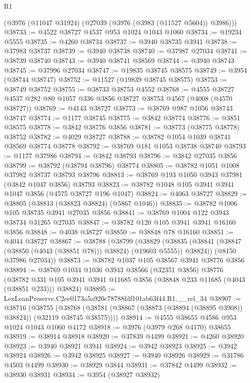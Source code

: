 \begin{lexlean}{R1}
\begin{coremodule}
    (@3976 (@11047 @31924) (@27039 (@3976 (@3983 (@11527 @5604)) @3986)))
@38733 := @4522 @38727 @4537 @953 @1024 @1043 @1060
@38734 := @19234 @5555
@38735 := @4260 @38734
@38737 := @3940 @38735 @3941
@38738 := @37983 @38737
@38739 := @3940 @38738
@38740 := @37987 @27034
@38741 := @38739 @38740
@38743 := @3940 @38741 @38569
@38744 := @3940 @38743
@38745 := @37996 @27034
@38747 := @19835 @38745 @38575
@38749 := @3954 (@38744 @38747)
@38752 := @11527 (@19839 @38745 @38575)
@38753 := @38749 @38752
@38755 := @38733 @38753 @4552
@38768 := @4555 @38727 @4537 @282 @80 @1057 @336 @3856 @38727 @38753 @4567 (@4008 (@4570 @38727))
@38769 := @4143 @38727
@38773 := @38769 @987 @1056 @38743 @38747
@38774 := @1177 @38745
@38775 := @3842 @38774
@38776 := @3851 @38575
@38778 := @3842 @38776 @3856
@38781 := @38773 (@38775 @38778) @38752
@38782 := @4029 @38727
@38788 := @38782 @1054 @1039 @38741 @38569 @38774 @38778
@38792 := @38769 @181 @1053 @38738 @38740
@38793 := @1177 @37986
@38794 := @3842 @38793
@38796 := @3842 @27035 @3856
@38799 := @38792 (@38794 @38796) @38774
@38805 := @38782 @1051 @1008 @37982 @38737 @38793 @38796
@38813 := @38769 @193 @1050 @3943 @37981 (@3842 @1047 @3856) @38793
@38823 := @38782 @1048 @105 @3941 @3941 @1047 @3856 (@4575 @38727 @196 @1047)
@38824 := @4063 @38727
@38829 := @38805 (@38813 (@38823 @38824) (@5867 @1046))
@38835 := @38782 @1006 @105 @38735 @3941 @27035 @3856
@38841 := @38769 @1004 @122 @3943 @38734 @31265 @27035
@38847 := @38782 @120 @105 @3941 @3941 @16160 @3856
@38848 := @4038 @38727
@38850 := @38848 @78 @16160
@38851 := @4044 @38727
@38867 := @38788
    (@38799
      (@38829 (@38835 (@38841 (@38847 (@38850 (@4043 (@38851 @78))) @38824) (@19603 @5555)) @38824))
      (@8150 @37986 @27034))
@38873 := @38782 @1037 @105 @38567 @3941 @38776 @3856
@38894 := @38769
    @1034
    @1036
    @3943
    @38566
    (@32351 @3856)
    @38776
    (@38782 @331 @105 @3941 @3941 @11685 @3856 (@38848 @233 @11685 (@4043 (@38851 @233))) @38824)
@38895 := LexLeanPreserve.C2ee0173a5a920c78788fdf101ab63f44.R1.__rel_34
@38907 := @38716
    (@38755
      (@38768 (@38781 (@38867 (@38873 (@38894 (@38895 @3908)) @38824)) (@32119 @38745 @38575))))
@38914 := @4555 @38655 @4586 @953 @1024 @1043 @1060 @4172
@38918 := @3976 (@3979 @268 @4170) @38655
@38919 := @38914 @38918
@38920 := @37839 @4499
@38921 := @4260 @38920
@38923 := @3940 @38921 @3941
@38924 := @3942 @38923
@38925 := @3942 @38924
@38926 := @3942 @38925
@38927 := @3940 @38926
@38929 := @31786 @4503 @4499
@38930 := @38929 @3844
@38931 := @37842 @4499
@38932 := @38930 @38931
@38934 := @3954 (@38927 @38932)

\end{coremodule}
\end{lexlean}
